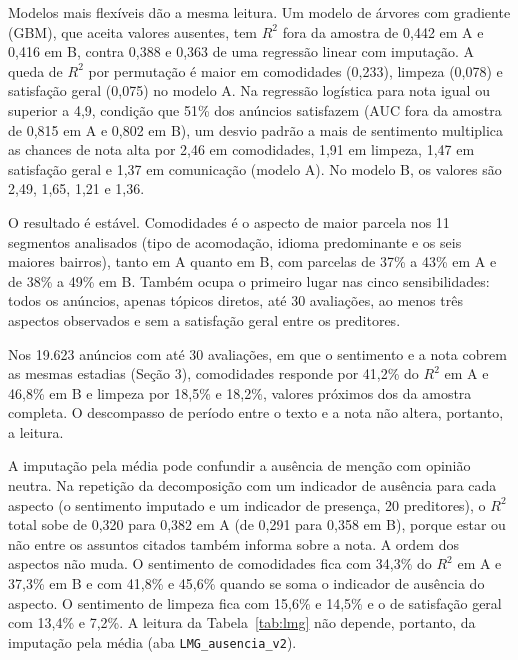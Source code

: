 Modelos mais flexíveis dão a mesma leitura. Um modelo de árvores com gradiente (GBM), que aceita valores ausentes, tem $R^2$ fora da amostra de 0,442 em A e 0,416 em B, contra 0,388 e 0,363 de uma regressão linear com imputação. A queda de $R^2$ por permutação é maior em comodidades (0,233), limpeza (0,078) e satisfação geral (0,075) no modelo A. Na regressão logística para nota igual ou superior a 4,9, condição que 51\% dos anúncios satisfazem (AUC fora da amostra de 0,815 em A e 0,802 em B), um desvio padrão a mais de sentimento multiplica as chances de nota alta por 2,46 em comodidades, 1,91 em limpeza, 1,47 em satisfação geral e 1,37 em comunicação (modelo A). No modelo B, os valores são 2,49, 1,65, 1,21 e 1,36.

O resultado é estável. Comodidades é o aspecto de maior parcela nos 11 segmentos analisados (tipo de acomodação, idioma predominante e os seis maiores bairros), tanto em A quanto em B, com parcelas de 37\% a 43\% em A e de 38\% a 49\% em B. Também ocupa o primeiro lugar nas cinco sensibilidades: todos os anúncios, apenas tópicos diretos, até 30 avaliações, ao menos três aspectos observados e sem a satisfação geral entre os preditores.

Nos 19.623 anúncios com até 30 avaliações, em que o sentimento e a nota cobrem as mesmas estadias (Seção 3), comodidades responde por 41,2\% do $R^2$ em A e 46,8\% em B e limpeza por 18,5\% e 18,2\%, valores próximos dos da amostra completa. O descompasso de período entre o texto e a nota não altera, portanto, a leitura.

A imputação pela média pode confundir a ausência de menção com opinião neutra. Na repetição da decomposição com um indicador de ausência para cada aspecto (o sentimento imputado e um indicador de presença, 20 preditores), o $R^2$ total sobe de 0,320 para 0,382 em A (de 0,291 para 0,358 em B), porque estar ou não entre os assuntos citados também informa sobre a nota. A ordem dos aspectos não muda. O sentimento de comodidades fica com 34,3\% do $R^2$ em A e 37,3\% em B e com 41,8\% e 45,6\% quando se soma o indicador de ausência do aspecto. O sentimento de limpeza fica com 15,6\% e 14,5\% e o de satisfação geral com 13,4\% e 7,2\%. A leitura da Tabela~\ref{tab:lmg} não depende, portanto, da imputação pela média (aba \texttt{LMG\_ausencia\_v2}).

